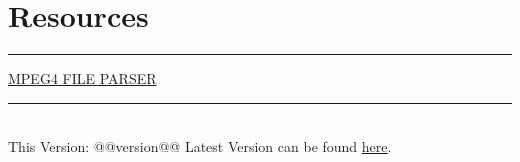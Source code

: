 \section{Resources}
\hrule

\medskip

\href{http://mp4parser.com}{MPEG4 FILE PARSER}
\vfill
\hrule
~\\
This Version: @@version@@
Latest Version can be found \href{https://github.com/robert-will-brown/video-tech-cheatsheet}{here}.
